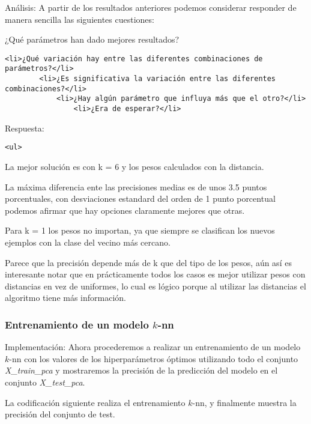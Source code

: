 \documentclass[11pt]{article}
\begin{document}
    Análisis: A partir de los resultados anteriores podemos considerar
responder de manera sencilla las siguientes cuestiones:

¿Qué parámetros han dado mejores resultados?

\begin{verbatim}
<li>¿Qué variación hay entre las diferentes combinaciones de parámetros?</li>
        <li>¿Es significativa la variación entre las diferentes combinaciones?</li>
            <li>¿Hay algún parámetro que influya más que el otro?</li>
                <li>¿Era de esperar?</li>
\end{verbatim}

    Respuesta:

\begin{verbatim}
<ul>
\end{verbatim}

La mejor solución es con k = 6 y los pesos calculados con la distancia.

La máxima diferencia ente las precisiones medias es de unos 3.5 puntos
porcentuales, con desviaciones estandard del orden de 1 punto porcentual
podemos afirmar que hay opciones claramente mejores que otras.

Para k = 1 los pesos no importan, ya que siempre se clasifican los
nuevos ejemplos con la clase del vecino más cercano.

Parece que la precisión depende más de k que del tipo de los pesos, aún
así es interesante notar que en prácticamente todos los casos es mejor
utilizar pesos con distancias en vez de uniformes, lo cual es lógico
porque al utilizar las distancias el algoritmo tiene más información.

    \hypertarget{entrenamiento-de-un-modelo-k-nn}{%
\subsubsection{\texorpdfstring{Entrenamiento de un modelo
\(k\)-nn}{Entrenamiento de un modelo k-nn}}\label{entrenamiento-de-un-modelo-k-nn}}

Implementación: Ahora procederemos a realizar un entrenamiento de un
modelo \(k\)-nn con los valores de los hiperparámetros óptimos
utilizando todo el conjunto \emph{X\_train\_pca} y mostraremos la
precisión de la predicción del modelo en el conjunto
\emph{X\_test\_pca}.

    La codificación siguiente realiza el entrenamiento \(k\)-nn, y
finalmente muestra la precisión del conjunto de test.
\end{document}
